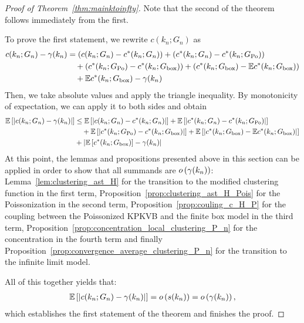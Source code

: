 \begin{proof}[Proof of Theorem~\ref{thm:mainktoinfty}]
Note that the second of the theorem follows immediately from the first.

To prove the first statement, we rewrite $c(k_n; G_n)$ as
\begin{align*}
    c(k_n;G_n)-\gamma(k_n) &= \left(c(k_n;G_n)-c^\ast(k_n;G_n)\right)
    	+ \left(c^\ast(k_n;G_n)-c^\ast(k_n; G_{\text{Po}})\right)\\
    &\hspace{10pt}+ \left(c^\ast(k_n; G_{\text{Po}})-c^\ast(k_n; G_{\text{box}})\right)
    	+ \left(c^\ast(k_n; G_{\text{box}})-\mathbb{E} c^\ast(k_n; G_{\text{box}})\right)\\
    &\hspace{10pt}+ \mathbb{E} c^\ast(k_n; G_{\text{box}})-\gamma(k_n)
\end{align*}
Then, we take absolute values and apply the triangle inequality. By monotonicity of expectation, we can apply it to both sides and obtain
\begin{align*}
    \mathbb{E}\left[\left|c(k_n;G_n)-\gamma(k_n)\right|\right] 
    &\le \mathbb{E}\left[\left|c(k_n;G_n)-c^\ast(k_n;G_n)\right|\right]
    	+\mathbb{E}\left[\left|c^\ast(k_n;G_n)-c^\ast(k_n; G_{\text{Po}})\right|\right]\\
    &\hspace{10pt}+ \mathbb{E}\left[\left|c^\ast(k_n; G_{\text{Po}})-c^\ast(k_n; G_{\text{box}})\right|\right] 
    	+ \mathbb{E}\left[\left|c^\ast(k_n; G_{\text{box}})-\mathbb{E} c^\ast(k_n; G_{\text{box}})\right|\right]\\
    &+ \left|\mathbb{E}\left[c^\ast(k_n; G_{\text{box}})\right]-\gamma(k_n)\right|
\end{align*}
At this point, the lemmas and propositions presented above in this section can be applied in order to show that all summands are $o\left(\gamma(k_n)\right)$: Lemma~\ref{lem:clustering_ast_H} for the transition to the modified clustering function in the first term, Proposition~\ref{prop:clustering_ast_H_Pois} for the Poissonization in the second term, Proposition~\ref{prop:couling_c_H_P} for the coupling between the Poissonized KPKVB and the finite box model in the third term, Proposition~\ref{prop:concentration_local_clustering_P_n} for the concentration in the fourth term and finally Proposition~\ref{prop:convergence_average_clustering_P_n} for the transition to the infinite limit model. 

All of this together yields that:
\begin{align*}
    \mathbb{E}\left[\left|c(k_n;G_n)-\gamma(k_n)\right|\right] = o\left(s(k_n)\right) = o\left(\gamma(k_n)\right),
\end{align*}
which establishes the first statement of the theorem and finishes the proof.  
\end{proof}

